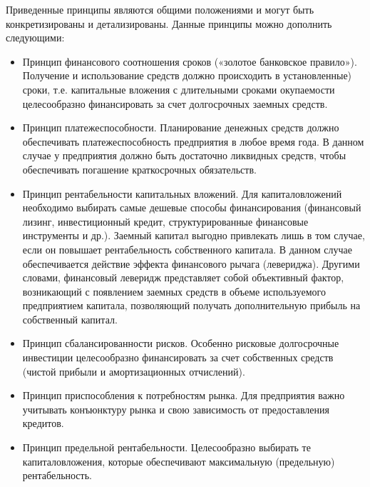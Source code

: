 Приведенные принципы являются общими положениями и могут быть конкретизированы и детализированы.
Данные принципы можно дополнить следующими:
\begin{itemize}
	\item Принцип финансового соотношения сроков («золотое банковское правило»).
	Получение и использование средств должно происходить в установленные) сроки, т.е. капитальные вложения с длительными сроками окупаемости целесообразно финансировать за счет долгосрочных заемных средств.
	\item Принцип платежеспособности.
	Планирование денежных средств должно обеспечивать платежеспособность предприятия в любое время года.
	В данном случае у предприятия должно быть достаточно ликвидных средств, чтобы обеспечивать погашение краткосрочных обязательств.
	\item Принцип рентабельности капитальных вложений.
	Для капиталовложений необходимо выбирать самые дешевые  способы финансирования (финансовый лизинг, инвестиционный кредит, структурированные финансовые инструменты и др.).
	Заемный капитал выгодно привлекать лишь в  том случае, если он повышает рентабельность собственного  капитала.
	В данном случае обеспечивается действие эффекта финансового рычага (левериджа).
	Другими словами, финансовый леверидж представляет собой объективный фактор, возникающий с появлением заемных средств в объеме  используемого предприятием капитала, позволяющий получать дополнительную прибыль на собственный капитал.

	\item Принцип сбалансированности рисков.
	Особенно рисковые  долгосрочные инвестиции целесообразно финансировать за  счет собственных средств (чистой прибыли и амортизационных отчислений).
	\item Принцип приспособления к потребностям рынка.
	Для  предприятия важно учитывать конъюнктуру рынка и свою зависимость от предоставления кредитов.
	\item Принцип предельной рентабельности.
	Целесообразно выбирать те капиталовложения, которые обеспечивают максимальную (предельную) рентабельность.
\end{itemize}










